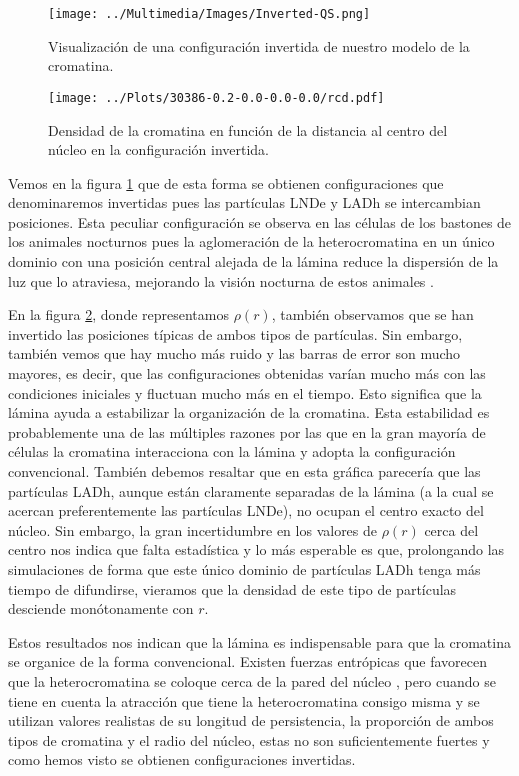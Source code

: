 \begin{figure}[p]
    \centering
    \texttt{[image: ../Multimedia/Images/Inverted-QS.png]}
    \caption{Visualización de una configuración invertida de nuestro modelo de la cromatina.}
    \label{fig:vmd_QS_image_i}
\end{figure}

\begin{figure}[p]
    \centering
    \texttt{[image: ../Plots/30386-0.2-0.0-0.0-0.0/rcd.pdf]}
    \caption{Densidad de la cromatina en función de la distancia al centro del núcleo en la configuración invertida.}
    \label{fig:rcd_i}
\end{figure}

Vemos en la figura \ref{fig:vmd_QS_image_i} que de esta forma se obtienen configuraciones que denominaremos invertidas pues las partículas LNDe y LADh se intercambian posiciones. Esta peculiar configuración se observa en las células de los bastones de los animales nocturnos pues la aglomeración de la heterocromatina en un único dominio con una posición central alejada de la lámina reduce la dispersión de la luz que lo atraviesa, mejorando la visión nocturna de estos animales \cite{Camara2023}.

En la figura \ref{fig:rcd_i}, donde representamos $\rho(r)$, también observamos que se han invertido las posiciones típicas de ambos tipos de partículas. Sin embargo, también vemos que hay mucho más ruido y las barras de error son mucho mayores, es decir, que las configuraciones obtenidas varían mucho más con las condiciones iniciales y fluctuan mucho más en el tiempo. Esto significa que la lámina ayuda a estabilizar la organización de la cromatina. Esta estabilidad es probablemente una de las múltiples razones por las que en la gran mayoría de células la cromatina interacciona con la lámina y adopta la configuración convencional. También debemos resaltar que en esta gráfica parecería que las partículas LADh, aunque están claramente separadas de la lámina (a la cual se acercan preferentemente las partículas LNDe), no ocupan el centro exacto del núcleo. Sin embargo, la gran incertidumbre en los valores de $\rho(r)$ cerca del centro nos indica que falta estadística y lo más esperable es que, prolongando las simulaciones de forma que este único dominio de partículas LADh tenga más tiempo de difundirse, vieramos que la densidad de este tipo de partículas desciende monótonamente con $r$.

Estos resultados nos indican que la lámina es indispensable para que la cromatina se organice de la forma convencional. Existen fuerzas entrópicas que favorecen que la heterocromatina se coloque cerca de la pared del núcleo \cite{Finan2010}, pero cuando se tiene en cuenta la atracción que tiene la heterocromatina consigo misma y se utilizan valores realistas de su longitud de persistencia, la proporción de ambos tipos de cromatina y el radio del núcleo, estas no son suficientemente fuertes y como hemos visto se obtienen configuraciones invertidas.

